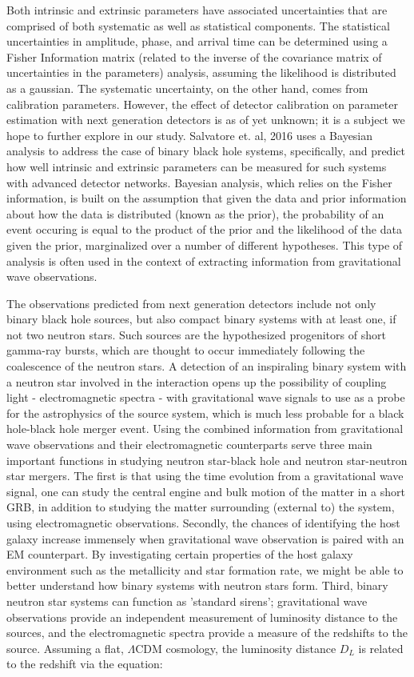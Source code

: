 \documentclass{article}
\begin{document}
Both intrinsic and extrinsic parameters have associated uncertainties that are comprised of both systematic as well as statistical components.  The statistical uncertainties in amplitude, phase, and arrival time can be determined using a Fisher Information matrix (related to the inverse of the covariance matrix of uncertainties in the parameters) analysis, assuming the likelihood is distributed as a gaussian.  The systematic uncertainty, on the other hand, comes from calibration parameters.  However, the effect of detector calibration on parameter estimation with next generation detectors is as of yet unknown; it is a subject we hope to further explore in our study. Salvatore et. al, 2016 uses a Bayesian analysis to address the case of binary black hole systems, specifically, and predict how well intrinsic and extrinsic parameters can be measured for such systems with advanced detector networks.  Bayesian analysis, which relies on the Fisher information, is built on the assumption that given the data and prior information about how the data is distributed (known as the prior), the probability of an event occuring is equal to the product of the prior and the likelihood of the data given the prior, marginalized over a number of different hypotheses.  This type of analysis is often used in the context of extracting information from gravitational wave observations. 

The observations predicted from next generation detectors include not only binary black hole sources, but also compact binary systems with at least one, if not two neutron stars.  Such sources are the hypothesized progenitors of short gamma-ray bursts, which are thought to occur immediately following the coalescence of the neutron stars.  A detection of an inspiraling binary system with a neutron star involved in the interaction opens up the possibility of coupling light - electromagnetic spectra - with gravitational wave signals to use as a probe for the astrophysics of the source system, which is much less probable for a black hole-black hole merger event.  Using the combined information from gravitational wave observations and their electromagnetic counterparts serve three main important functions in studying neutron star-black hole and neutron star-neutron star mergers.  The first is that using the time evolution from a gravitational wave signal, one can study the central engine and bulk motion of the matter in a short GRB, in addition to studying the matter surrounding (external to) the system, using electromagnetic observations.  Secondly, the chances of identifying the host galaxy increase immensely when gravitational wave observation is paired with an EM counterpart.  By investigating certain properties of the host galaxy environment such as the metallicity and star formation rate, we might be able to better understand how binary systems with neutron stars form.  Third, binary neutron star systems can function as 'standard sirens'; gravitational wave observations provide an independent measurement of luminosity distance to the sources, and the electromagnetic spectra provide a measure of the redshifts to the source.  Assuming a flat, $\Lambda$CDM cosmology, the luminosity distance $D_L$ is related to the redshift via the equation:
\end{document}
